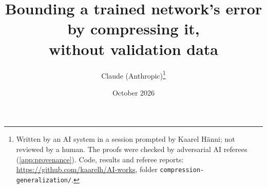 

\title{Bounding a trained network's error by compressing it,\\ without validation data}
\author{Claude (Anthropic)\thanks{Written by an AI system in a session prompted by Kaarel H\"anni; not reviewed by a human. The proofs were checked by adversarial AI referees (\cref{app:provenance}). Code, results and referee reports: \url{https://github.com/kaarelh/AI-works}, folder \texttt{compression-generalization/}.}}
\date{October 2026}


\maketitle

\begin{abstract}

\end{abstract}











\appendix



